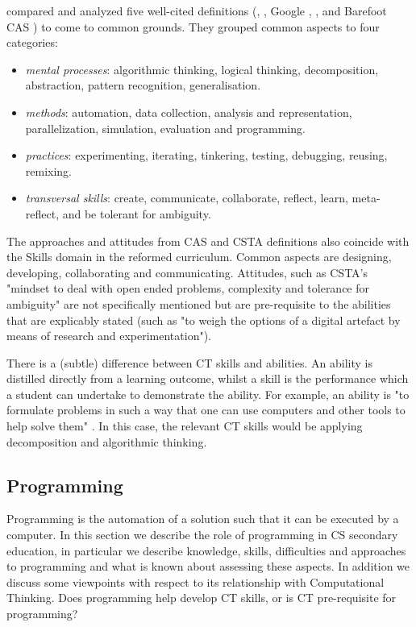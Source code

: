  compared and analyzed five well-cited definitions (\cite{Wing2006}, \cite{CSTA2011CT}, Google \cite{Google2017CT}, \cite{BrennanResnick2012}, and Barefoot CAS \cite{CAS2014CT}) to come to common grounds. They grouped common aspects to four categories:
\begin{itemize}
\item \emph{mental processes}: algorithmic thinking, logical thinking, decomposition, abstraction, pattern recognition, generalisation.
\item \emph{methods}: automation, data collection, analysis and representation, parallelization, simulation, evaluation and programming.
\item \emph{practices}: experimenting, iterating, tinkering, testing, debugging, reusing, remixing.
\item \emph{transversal skills}: create, communicate, collaborate, reflect, learn, meta-reflect, and be tolerant for ambiguity.
\end{itemize}

The approaches and attitudes from CAS and CSTA definitions also coincide with the Skills domain in the reformed curriculum. Common aspects are designing, developing, collaborating and communicating. Attitudes, such as CSTA's "mindset to deal with open ended problems, complexity and tolerance for ambiguity" are not specifically mentioned but are pre-requisite to the abilities that are explicably stated (such as "to weigh the options of a digital artefact by means of research and experimentation").



There is a (subtle) difference between CT skills and abilities. An ability is distilled directly from a learning outcome, whilst a skill is the performance which a student can undertake to demonstrate the ability. For example, an ability is "to formulate problems in such a way that one can use computers and other tools to help solve them" \cite{Barendsen2016}. In this case, the relevant CT skills would be applying decomposition and algorithmic thinking.

\subsection{Programming}
Programming is the automation of a solution such that it can be executed by a computer. In this section we describe the role of programming in CS secondary education, in particular we describe knowledge, skills, difficulties and approaches to programming and what is known about assessing these aspects. In addition we discuss some viewpoints with respect to its relationship with Computational Thinking. Does programming help develop CT skills, or is CT pre-requisite for programming?



